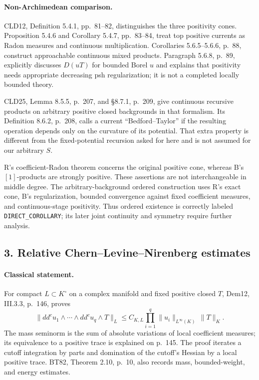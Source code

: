 \documentclass[11pt,a4paper]{article}
\numberwithin{equation}{section}
\theoremstyle{definition}
\theoremstyle{remark}
\begin{document}
\paragraph{Non-Archimedean comparison.}
CLD12, Definition 5.4.1, pp.~81--82, distinguishes the three positivity
cones. Proposition 5.4.6 and Corollary 5.4.7, pp.~83--84, treat top positive
currents as Radon measures and continuous multiplication. Corollaries
5.6.5--5.6.6, p.~88, construct approachable continuous mixed products.
Paragraph 5.6.8, p.~89, explicitly discusses \(D(uT)\) for bounded Borel
\(u\) and explains that positivity needs appropriate decreasing psh
regularization; it is not a completed locally bounded theory.
\cite[\S\S5.4, 5.6]{CLD12}

CLD25, Lemma 8.5.5, p.~207, and \S8.7.1, p.~209, give continuous
recursive products on arbitrary positive closed backgrounds in that
formalism. Its Definition 8.6.2, p.~208, calls a current ``Bedford--Taylor''
if the resulting operation depends only on the curvature of its potential.
That extra property is different from the fixed-potential recursion asked
for here and is not assumed for our arbitrary \(S\).
\cite[\S\S8.5--8.7]{CLD25}

R's coefficient-Radon theorem concerns the original positive cone, whereas
B's \([1]\)-products are strongly positive. These assertions are not
interchangeable in middle degree. The arbitrary-background ordered
construction uses R's exact cone, B's regularization, bounded convergence
against fixed coefficient measures, and continuous-stage positivity. Thus
ordered existence is correctly labeled \texttt{DIRECT\_COROLLARY}; its
later joint continuity and symmetry require further analysis.

\subsection{3. Relative Chern--Levine--Nirenberg estimates}

\paragraph{Classical statement.}
For compact \(L\subset K^\circ\) on a complex manifold and fixed positive
closed \(T\), Dem12, III.3.3, p.~146, proves
\[
 \|dd^cu_1\wedge\cdots\wedge dd^cu_q\wedge T\|_L
 \leq C_{K,L}\prod_{i=1}^q\|u_i\|_{L^\infty(K)}\,\|T\|_K.
\]
The mass seminorm is the sum of absolute variations of local coefficient
measures; its equivalence to a positive trace is explained on p.~145.
The proof iterates a cutoff integration by parts and domination of the
cutoff's Hessian by a local positive trace. BT82, Theorem 2.10, p.~10,
also records mass, bounded-weight, and energy estimates.
\cite[III.3.3]{Dem12}\cite[Theorem 2.10]{BT82}
\end{document}
